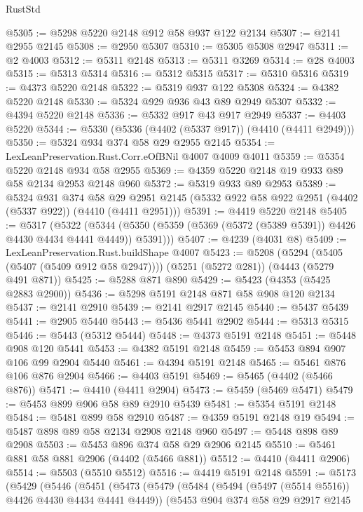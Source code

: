 \begin{lexlean}{RustStd}
\begin{coremodule}
@5305 := @5298 @5220 @2148 @912 @58 @937 @122 @2134
@5307 := @2141 @2955 @2145
@5308 := @2950 @5307
@5310 := @5305 @5308 @2947
@5311 := @2 @4003
@5312 := @5311 @2148
@5313 := @5311 @3269
@5314 := @28 @4003
@5315 := @5313 @5314
@5316 := @5312 @5315
@5317 := @5310 @5316
@5319 := @4373 @5220 @2148
@5322 := @5319 @937 @122 @5308
@5324 := @4382 @5220 @2148
@5330 := @5324 @929 @936 @43 @89 @2949 @5307
@5332 := @4394 @5220 @2148
@5336 := @5332 @917 @43 @917 @2949
@5337 := @4403 @5220
@5344 := @5330 (@5336 (@4402 (@5337 @917)) (@4410 (@4411 @2949)))
@5350 := @5324 @934 @374 @58 @29 @2955 @2145
@5354 := LexLeanPreservation.Rust.Corr.eOfBNil @4007 @4009 @4011
@5359 := @5354 @5220 @2148 @934 @58 @2955
@5369 := @4359 @5220 @2148 @19 @933 @89 @58 @2134 @2953 @2148 @960
@5372 := @5319 @933 @89 @2953
@5389 := @5324
    @931
    @374
    @58
    @29
    @2951
    @2145
    (@5332 @922 @58 @922 @2951 (@4402 (@5337 @922)) (@4410 (@4411 @2951)))
@5391 := @4419 @5220 @2148
@5405 := @5317
    (@5322
      (@5344 (@5350 (@5359 (@5369 (@5372 (@5389 @5391)) @4426 @4430 @4434 @4441 @4449)) @5391)))
@5407 := @4239 (@4031 @8)
@5409 := LexLeanPreservation.Rust.buildShape @4007
@5423 := @5208
    (@5294 (@5405 (@5407 (@5409 @912 @58 @2947))))
    (@5251 (@5272 @281))
    (@4443 (@5279 @491 @871))
@5425 := @5288 @871 @890
@5429 := @5423 (@4353 (@5425 @2883 @2900))
@5436 := @5298 @5191 @2148 @871 @58 @908 @120 @2134
@5437 := @2141 @2910
@5439 := @2141 @2917 @2145
@5440 := @5437 @5439
@5441 := @2905 @5440
@5443 := @5436 @5441 @2902
@5444 := @5313 @5315
@5446 := @5443 (@5312 @5444)
@5448 := @4373 @5191 @2148
@5451 := @5448 @908 @120 @5441
@5453 := @4382 @5191 @2148
@5459 := @5453 @894 @907 @106 @99 @2904 @5440
@5461 := @4394 @5191 @2148
@5465 := @5461 @876 @106 @876 @2904
@5466 := @4403 @5191
@5469 := @5465 (@4402 (@5466 @876))
@5471 := @4410 (@4411 @2904)
@5473 := @5459 (@5469 @5471)
@5479 := @5453 @899 @906 @58 @89 @2910 @5439
@5481 := @5354 @5191 @2148
@5484 := @5481 @899 @58 @2910
@5487 := @4359 @5191 @2148 @19
@5494 := @5487 @898 @89 @58 @2134 @2908 @2148 @960
@5497 := @5448 @898 @89 @2908
@5503 := @5453 @896 @374 @58 @29 @2906 @2145
@5510 := @5461 @881 @58 @881 @2906 (@4402 (@5466 @881))
@5512 := @4410 (@4411 @2906)
@5514 := @5503 (@5510 @5512)
@5516 := @4419 @5191 @2148
@5591 := @5173
    (@5429
      (@5446
        (@5451
          (@5473
            (@5479
              (@5484 (@5494 (@5497 (@5514 @5516)) @4426 @4430 @4434 @4441 @4449))
              (@5453
                @904
                @374
                @58
                @29
                @2917
                @2145

\end{coremodule}
\end{lexlean}
